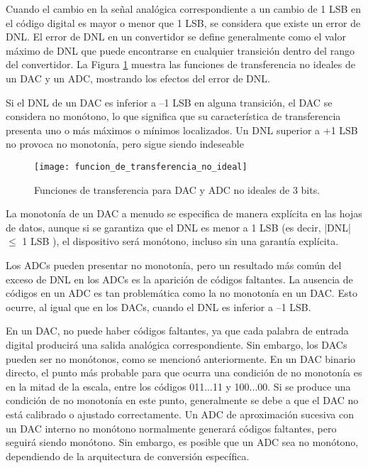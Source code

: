     Cuando el cambio en la señal analógica correspondiente a un cambio de 1 LSB en el código digital es mayor o menor que 1 LSB, se considera que existe un error de DNL. El error de DNL en un convertidor se define generalmente como el valor máximo de DNL que puede encontrarse en cualquier transición dentro del rango del convertidor. La Figura \ref{fig:funcion_de_transferencia_no_ideal} muestra las funciones de transferencia no ideales de un DAC y un ADC, mostrando los efectos del error de DNL.

    Si el DNL de un DAC es inferior a –1 LSB en alguna transición, el DAC se considera no monótono, lo que significa que su característica de transferencia presenta uno o más máximos o mínimos localizados. Un DNL superior a +1 LSB no provoca no monotonía, pero sigue siendo indeseable

    \begin{figure}[!h]
      \centering
      \texttt{[image: funcion\_de\_transferencia\_no\_ideal]}
      \caption{Funciones de transferencia para DAC y ADC no ideales de 3 bits.}
      \label{fig:funcion_de_transferencia_no_ideal}
    \end{figure}

    La monotonía de un DAC a menudo se especifica de manera explícita en las hojas de datos, aunque si se garantiza que el DNL es menor a 1 LSB (es decir, |DNL| $\leq$ 1 LSB ), el dispositivo será monótono, incluso sin una garantía explícita.

    Los ADCs pueden presentar no monotonía, pero un resultado más común del exceso de DNL en los ADCs es la aparición de códigos faltantes. La ausencia de códigos en un ADC es tan problemática como la no monotonía en un DAC. Esto ocurre, al igual que en los DACs, cuando el DNL es inferior a –1 LSB.

    En un DAC, no puede haber códigos faltantes, ya que cada palabra de entrada digital producirá una salida analógica correspondiente. Sin embargo, los DACs pueden ser no monótonos, como se mencionó anteriormente. En un DAC binario directo, el punto más probable para que ocurra una condición de no monotonía es en la mitad de la escala, entre los códigos 011...11 y 100...00. Si se produce una condición de no monotonía en este punto, generalmente se debe a que el DAC no está calibrado o ajustado correctamente. Un ADC de aproximación sucesiva con un DAC interno no monótono normalmente generará códigos faltantes, pero seguirá siendo monótono. Sin embargo, es posible que un ADC sea no monótono, dependiendo de la arquitectura de conversión específica.

